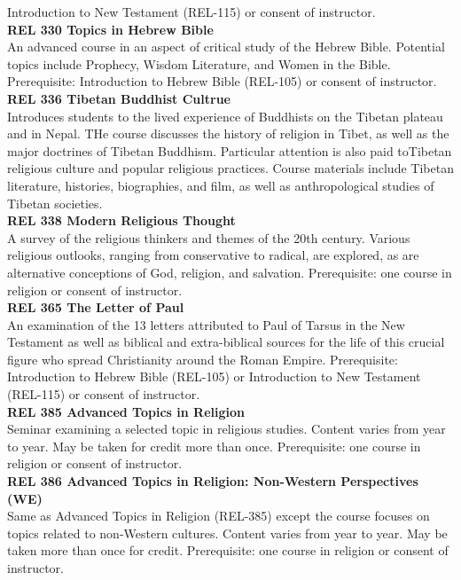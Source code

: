\documentclass[
  letterpaper,
]{scrbook}
\begin{document}
Introduction to New Testament (REL-115) or consent of instructor.\\
\textbf{REL 330 Topics in Hebrew Bible}\\
An advanced course in an aspect of critical study of the Hebrew Bible.
Potential topics include Prophecy, Wisdom Literature, and Women in the
Bible. Prerequisite: Introduction to Hebrew Bible (REL-105) or consent
of instructor.\\
\textbf{REL 336 Tibetan Buddhist Cultrue}\\
Introduces students to the lived experience of Buddhists on the Tibetan
plateau and in Nepal. THe course discusses the history of religion in
Tibet, as well as the major doctrines of Tibetan Buddhism. Particular
attention is also paid toTibetan religious culture and popular religious
practices. Course materials include Tibetan literature, histories,
biographies, and film, as well as anthropological studies of Tibetan
societies.\\
\textbf{REL 338 Modern Religious Thought}\\
A survey of the religious thinkers and themes of the 20th century.
Various religious outlooks, ranging from conservative to radical, are
explored, as are alternative conceptions of God, religion, and
salvation. Prerequisite: one course in religion or consent of
instructor.\\
\textbf{REL 365 The Letter of Paul}\\
An examination of the 13 letters attributed to Paul of Tarsus in the New
Testament as well as biblical and extra-biblical sources for the life of
this crucial figure who spread Christianity around the Roman Empire.
Prerequisite: Introduction to Hebrew Bible (REL-105) or Introduction to
New Testament (REL-115) or consent of instructor.\\
\textbf{REL 385 Advanced Topics in Religion}\\
Seminar examining a selected topic in religious studies. Content varies
from year to year. May be taken for credit more than once. Prerequisite:
one course in religion or consent of instructor.\\
\textbf{REL 386 Advanced Topics in Religion: Non-Western Perspectives
(WE)}\\
Same as Advanced Topics in Religion (REL-385) except the course focuses
on topics related to non-Western cultures. Content varies from year to
year. May be taken more than once for credit. Prerequisite: one course
in religion or consent of instructor.\\
\end{document}
